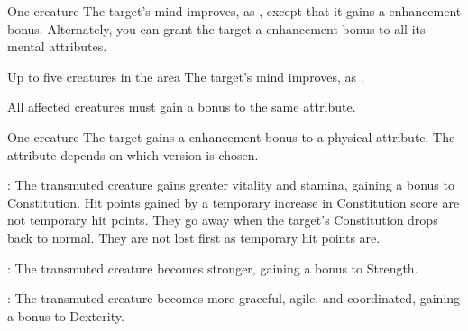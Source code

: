 \begin{spellheader}
    \spellrng{\rngtouch}
    \spelldur{\durshort}
\end{spellheader}
\begin{spelleffects}
    \begin{spelltarget}{One creature}
        \spelleffect The target's mind improves, as , except that it gains a  enhancement bonus. Alternately, you can grant the target a  enhancement bonus to all its mental attributes.
    \end{spelltarget}
\end{spelleffects}

\begin{spellheader}
\end{spellheader}
\begin{spelleffects}
    \begin{spelltargets}{Up to five creatures in the area}
        \spelleffect The target's mind improves, as . 
    \end{spelltargets}
\end{spelleffects}
\begin{spellfooter}
    \spellnotes All affected creatures must gain a bonus to the same attribute.
\end{spellfooter}

\begin{spellheader}
    \spellrng{\rngtouch}
    \spelldur{\durshort}
\end{spellheader}
\begin{spelleffects}
    \begin{spelltarget}{One creature}
        \spelleffect The target gains a  enhancement bonus to a physical attribute. The attribute depends on which version is chosen.
        \par {}: The transmuted creature gains greater vitality and stamina, gaining a bonus to Constitution. Hit points gained by a temporary increase in Constitution score are not temporary hit points. They go away when the target's Constitution drops back to normal. They are not lost first as temporary hit points are.
        \par {}: The transmuted creature becomes stronger, gaining a bonus to Strength.
        \par {}: The transmuted creature becomes more graceful, agile, and coordinated, gaining a bonus to Dexterity.
    \end{spelltarget}
\end{spelleffects}


